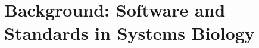 \newcommand{\bgamma}{\mbox{\boldmath $\Gamma$}}

\newcommand{\bL}{\mbox{\boldmath $L$}}

\newcommand{\bT}{\mbox{\boldmath $T$}}

\newcommand{\bI}{\mbox{\boldmath $I$}}

\newcommand{\bM}{\mbox{\boldmath $M$}}

\newcommand{\bm}{\mbox{\boldmath $m$}}

\newcommand{\bN}{\mbox{\boldmath $N$}}

\newcommand{\bE}{\mbox{\boldmath $E$}}

\newcommand{\bA}{\mbox{\boldmath $A$}}

\newcommand{\bB}{\mbox{\boldmath $B$}}

\newcommand{\bK}{\mbox{\boldmath $K$}}

\newcommand{\bP}{\mbox{\boldmath $P$}}

\newcommand{\bx}{\mbox{\boldmath $x$}}

\newcommand{\bU}{\mbox{\boldmath $U$}}

\newcommand{\bV}{\mbox{\boldmath $V$}}

\newcommand{\bZero}{\mbox{\boldmath $0$}}

\newcommand{\bLo}{\mbox{\boldmath $L_0$}}

\newcommand{\bNo}{\mbox{\boldmath $N_0$}}

\newcommand{\bNr}{\mbox{\boldmath $N_R$}}

\newcommand{\bSi}{\mbox{\boldmath $S_i$}}

\newcommand{\bSd}{\mbox{\boldmath $S_d$}}

\newcommand{\bdSi}{\mbox{\boldmath $dS_i$}}

\newcommand{\bdSd}{\mbox{\boldmath $dS_d$}}

\newcommand{\bS}{\mbox{\boldmath $S$}}

\newcommand{\bdS}{\mbox{\boldmath $dS$}}

\newcommand{\bdt}{\mbox{\boldmath $dt$}}

\newcommand{\bdSdt}{\mbox{$\displaystyle \frac{\bdS}{\bdt}$}}

\newcommand{\bdSddt}{\mbox{$\displaystyle \frac{\bdS_d}{\bdt}$}}

\newcommand{\bdSidt}{\mbox{$\displaystyle \frac{\bdS_i}{\bdt}$}}

\newcommand{\bv}{\mbox{\boldmath $v$}}

\newcommand{\bp}{\mbox{\boldmath $p$}}


\chapter{Background: Software and Standards in Systems Biology}
\label{chap:background}

